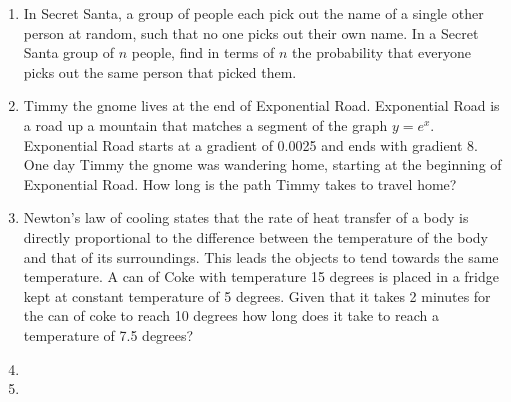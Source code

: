 \documentclass{article}
\begin{document}
\begin{enumerate}
    \item
    In Secret Santa, a group of people each pick out the name of a single other person at random, such that no one picks out their own name. In a Secret Santa group of $n$ people, find in terms of $n$ the probability that everyone picks out the same person that picked them.
            
    \item
    Timmy the gnome lives at the end of Exponential Road. Exponential Road is a road up a mountain that matches a segment of the graph $y = e^x$. Exponential Road starts at a gradient of 0.0025 and ends with gradient 8. One day Timmy the gnome was wandering home, starting at the beginning of Exponential Road. How long is the path Timmy takes to travel home?

    
    \item
    Newton's law of cooling states that the rate of heat transfer of a body is directly proportional to the difference between the temperature of the body and that of its surroundings. This leads the objects to tend towards the same temperature. A can of Coke with temperature 15 degrees is placed in a fridge kept at constant temperature of 5 degrees. Given that it takes 2 minutes for the can of coke to reach 10 degrees how long does it take to reach a temperature of 7.5 degrees?
    
    \item
    
    \item


    
    
    
    
    
    
\end{enumerate}
\end{document}
